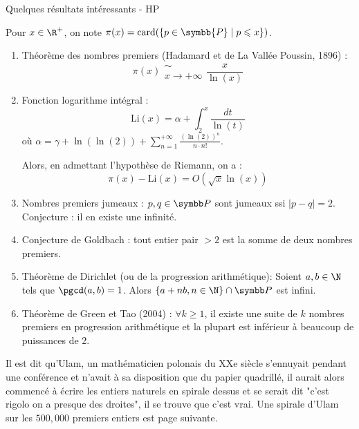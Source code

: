 \begin{proposition}{Quelques résultats intéressants - HP}{}

    Pour $x \in \R^+$, on note $\pi(x) = \text{card}(\{p \in \symbb{P} \mid p \leqslant x\})$.

    \begin{enumerate}
        \item Théorème des nombres premiers (Hadamard et de La Vallée Poussin, 1896) :
        \[\pi(x) \substack{\sim \\ x \to + \infty} \frac x {\ln(x)}\]
        \item Fonction logarithme intégral : 
        \[\mathrm{Li}(x) = \alpha + \int_2^x \frac {dt}{\ln(t)}\]
        où $\displaystyle \alpha = \gamma + \ln(\ln(2)) + \sum_{n = 1}^{+\infty} \frac{(\ln(2))^n}{n \cdot n!}$. 

        Alors, en admettant l'hypothèse de Riemann, on a : 
        \[\pi(x)  - \mathrm{Li}(x) = O(\sqrt x \ln(x))\]


        \item Nombres premiers jumeaux : $p, q \in \symbb P$ sont jumeaux ssi $|p - q| = 2$. 
        Conjecture : il en existe une infinité. 
        \item Conjecture de Goldbach : tout entier pair $> 2$ est la somme de deux nombres premiers.
    
        \item Théorème de Dirichlet (ou de la progression arithmétique): Soient $a, b \in \N$ tels que $\pgcd(a, b) = 1$. Alors 
        $\{a + nb, n \in \N\} \cap \symbb P$ est infini.
        \item Théorème de Green et Tao (2004) : $\forall k \geqslant 1$, il existe une suite de $k$ nombres premiers 
        en progression arithmétique et la plupart est inférieur à beaucoup de puissances de 2.
    \end{enumerate}
\end{proposition}

\begin{remarque}
    Il est dit qu'Ulam, un mathématicien polonais du XXe siècle s'ennuyait pendant une conférence
    et n'avait à sa disposition que du papier quadrillé, il aurait alors commencé à écrire les entiers
    naturels en spirale dessus et se serait dit "c'est rigolo on a presque des droites", il se trouve
    que c'est vrai. Une spirale d'Ulam sur les $500,000$ premiers entiers est page suivante.    
\end{remarque}

